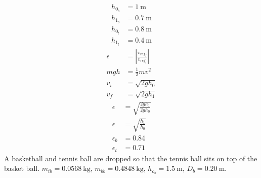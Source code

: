 \documentclass{article}
\begin{document}
\begin{align*}
	h_{0_b} & = \SI{1}{\meter} \\
	h_{1_b} & = \SI{0.7}{\meter} \\
	h_{0_t} & = \SI{0.8}{\meter} \\
	h_{1_t} & = \SI{0.4}{\meter}
\end{align*}
\begin{align*}
	\epsilon & = \left| \frac{v_{ref_f}}{v_{ref_i}} \right| \\
	mgh & = \frac{1}{2}mv^2 \\
	v_i & = \sqrt{2gh_0} \\
	v_f & = \sqrt{2gh_1}
\end{align*}
\begin{align*}
	\epsilon & = \sqrt{ \frac{2gh_1}{2gh_0} } \\
	\epsilon & = \sqrt{ \frac{h_1}{h_0} } \\
	\epsilon_b & = 0.84 \\
	\epsilon_t & = 0.71
\end{align*}
A basketball and tennis ball are dropped so that the tennis ball sits on top of the basket ball. $ m_{tb} = \SI{0.0568}{\kilogram} $, $ m_{bb} = \SI{0.4848}{\kilogram} $, $ h_{o_b} = \SI{1.5}{\meter} $, $ D_b = \SI{0.20}{\meter} $.
\end{document}
